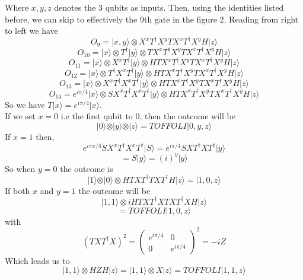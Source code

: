 \documentclass[12pt]{article}
\newcommand{\ket}[1]{\vert{#1}\rangle}
\begin{document}
\begin{enumerate}
\begin{figure}[h]
    \end{figure}
    Where $x,y,z$ denotes the 3 qubits as inputs. Then, using the identities listed before, we can skip to effectively the 9th gate in the figure 2. Reading from right to left we have 
    $$ O_9 = \ket{x,y} \otimes X^x T^\dagger X^y T X^x T^\dagger X^y H \ket{z} $$
    $$ O_{10} = \ket{x} \otimes T^\dagger \ket{y} \otimes TX^x T^\dagger X^y T X^x T^\dagger X^y H \ket{z} $$
    $$ O_{11} = \ket{x} \otimes X^x T^\dagger \ket{y} \otimes HTX^x T^\dagger X^y T X^x T^\dagger X^y H \ket{z} $$
    $$ O_{12} = \ket{x} \otimes T^\dagger X^x T^\dagger \ket{y} \otimes HTX^x T^\dagger X^y T X^x T^\dagger X^y H \ket{z} $$
    $$ O_{13} = \ket{x} \otimes X^x T^\dagger X^x T^\dagger \ket{y} \otimes HTX^x T^\dagger X^y TX^x T^\dagger X^y H \ket{z} $$
    $$ O_{14} = e^{i \pi /4} \ket{x} \otimes SX^x T^\dagger X^x T^\dagger \ket{y} \otimes HTX^x T^\dagger X^y T X^x T^\dagger X^y H \ket{z} $$
So we have $T \ket{x} = e^{i \pi /4} \ket{x} $.
\\ 
If we set $x =0$ i.e the first qubit to 0, then the outcome will be 
$$ \ket{0} \otimes \ket{y} \otimes \ket{z} = TOFFOLI \ket{0,y,z} $$
If $x=1$ then, 
$$ e^{i \pi x /4} SX^x T^\dagger X^x T^\dagger \ket{S} = e^{i \pi /4} SXT^\dagger XT^\dagger \ket{y} $$
$$ = S \ket{y} = (i)^y \ket{y} $$
So when $y = 0$ the outcome is 
$$ \ket{1} \otimes \ket{0} \otimes HTXT^\dagger TXT^\dagger H \ket{z} = \ket{1,0,z} $$
If both $x$ and $y=1$ the outcome will be 
$$ \ket{1,1} \otimes iHTXT^\dagger XTXT^\dagger XH\ket{z} $$
$$ = TOFFOLI \ket{1,0,z} $$
with 
$$ (TXT^\dagger X)^2 = \left(\begin{array}{cc} e^{i \pi /4} & 0 \\  0 & e^{i \pi /4} \end{array}\right)^2 = -i Z $$
Which leads us to 
$$ \ket{1,1} \otimes HZH \ket{z} = \ket{1,1} \otimes X \ket{z} = TOFFOLI \ket{1,1,z} $$ 




\end{enumerate}
\end{document}
